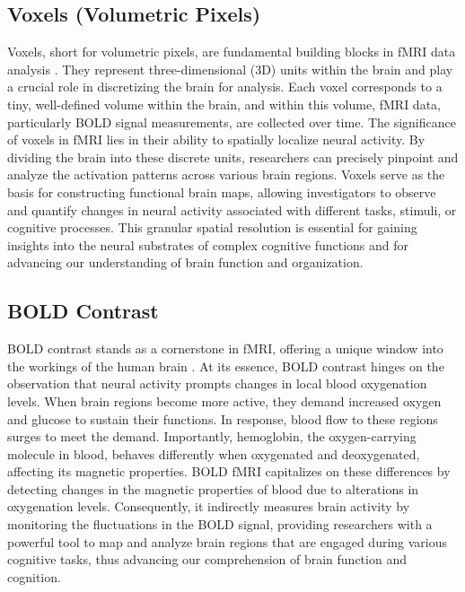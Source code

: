 \subsection{Voxels (Volumetric Pixels)}

Voxels, short for volumetric pixels, are fundamental building blocks in fMRI data analysis \cite{norman2006beyond}. They represent three-dimensional (3D) units within the brain and play a crucial role in discretizing the brain for analysis. Each voxel corresponds to a tiny, well-defined volume within the brain, and within this volume, fMRI data, particularly BOLD signal measurements, are collected over time. The significance of voxels in fMRI lies in their ability to spatially localize neural activity. By dividing the brain into these discrete units, researchers can precisely pinpoint and analyze the activation patterns across various brain regions. Voxels serve as the basis for constructing functional brain maps, allowing investigators to observe and quantify changes in neural activity associated with different tasks, stimuli, or cognitive processes. This granular spatial resolution is essential for gaining insights into the neural substrates of complex cognitive functions and for advancing our understanding of brain function and organization.

\subsection{BOLD Contrast}

BOLD contrast stands as a cornerstone in fMRI, offering a unique window into the workings of the human brain \cite{logothetis2004nature}. At its essence, BOLD contrast hinges on the observation that neural activity prompts changes in local blood oxygenation levels. When brain regions become more active, they demand increased oxygen and glucose to sustain their functions. In response, blood flow to these regions surges to meet the demand. Importantly, hemoglobin, the oxygen-carrying molecule in blood, behaves differently when oxygenated and deoxygenated, affecting its magnetic properties. BOLD fMRI capitalizes on these differences by detecting changes in the magnetic properties of blood due to alterations in oxygenation levels. Consequently, it indirectly measures brain activity by monitoring the fluctuations in the BOLD signal, providing researchers with a powerful tool to map and analyze brain regions that are engaged during various cognitive tasks, thus advancing our comprehension of brain function and cognition.

